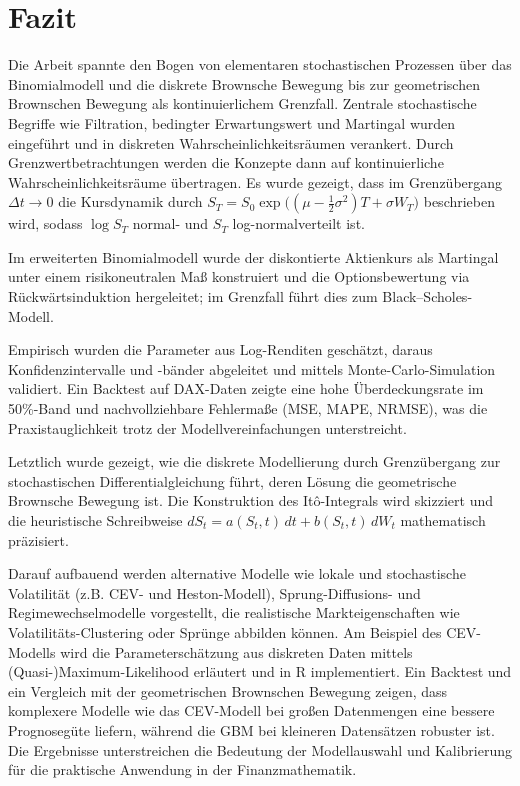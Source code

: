 \newpage

\section{Fazit}

Die Arbeit spannte den Bogen von elementaren stochastischen Prozessen über das Binomialmodell und die diskrete Brownsche 
Bewegung bis zur geometrischen Brownschen Bewegung als kontinuierlichem Grenzfall. Zentrale stochastische Begriffe wie 
Filtration, bedingter Erwartungswert und Martingal wurden eingeführt und in diskreten Wahrscheinlichkeitsräumen verankert. 
Durch Grenzwertbetrachtungen werden die Konzepte dann auf kontinuierliche Wahrscheinlichkeitsräume übertragen. Es wurde gezeigt, dass im Grenzübergang $\Delta t \to 0$ die Kursdynamik durch
$S_T = S_0 \exp\!\big((\mu - \tfrac12\sigma^2)T + \sigma W_T\big)$
beschrieben wird, sodass $\log S_T$ normal- und $S_T$ log-normalverteilt ist. 

Im erweiterten Binomialmodell wurde der diskontierte Aktienkurs als Martingal unter einem risikoneutralen Maß konstruiert und die Optionsbewertung 
via Rückwärtsinduktion hergeleitet; im Grenzfall führt dies zum Black–Scholes-Modell.

Empirisch wurden die Parameter aus 
Log-Renditen geschätzt, daraus Konfidenzintervalle und -bänder abgeleitet und mittels Monte-Carlo-Simulation validiert. 
Ein Backtest auf DAX-Daten zeigte eine hohe Überdeckungsrate im 50\%-Band und nachvollziehbare Fehlermaße (MSE, MAPE, NRMSE), 
was die Praxistauglichkeit trotz der Modellvereinfachungen unterstreicht. 

Letztlich wurde gezeigt, wie die diskrete Modellierung durch Grenzübergang zur stochastischen Differentialgleichung führt, deren Lösung die 
geometrische Brownsche Bewegung ist. Die Konstruktion des Itô-Integrals wird skizziert und die 
heuristische Schreibweise $dS_t = a(S_t,t)\,dt + b(S_t,t)\,dW_t$ mathematisch präzisiert.

Darauf aufbauend werden alternative Modelle wie lokale und stochastische Volatilität (z.B. CEV- und Heston-Modell), Sprung-Diffusions- und Regimewechselmodelle vorgestellt, die realistische Markteigenschaften wie Volatilitäts-Clustering oder Sprünge abbilden können. 
Am Beispiel des CEV-Modells wird die Parameterschätzung aus diskreten Daten mittels (Quasi-)Maximum-Likelihood erläutert und in R implementiert. Ein Backtest und ein Vergleich mit der geometrischen Brownschen Bewegung zeigen, dass komplexere Modelle wie das CEV-Modell bei großen Datenmengen eine bessere Prognosegüte liefern, während die GBM bei kleineren Datensätzen robuster ist. Die Ergebnisse unterstreichen die Bedeutung der Modellauswahl und Kalibrierung für die praktische Anwendung in der Finanzmathematik.


